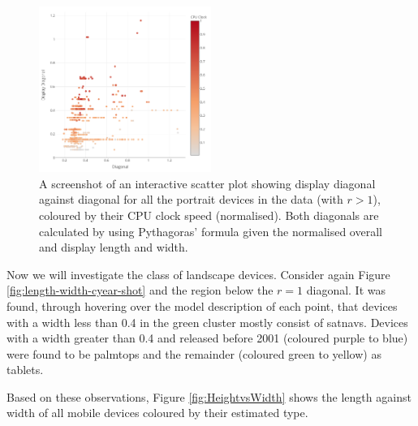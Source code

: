 \documentclass[conference]{IEEEtran}
\begin{document}
\begin{figure}
    \centering
    \includegraphics[width=0.5\textwidth]{../Visualisations/A/ddiag-diag-ccpu-shot.png}
	\caption{\label{fig:ddiag-diag-ccpu-shot}A screenshot of an interactive
	scatter plot showing display diagonal against diagonal
	for all the portrait devices in the data (with $r>1$), coloured by their
	CPU clock speed (normalised). Both diagonals are calculated by using
	Pythagoras' formula given the normalised overall and display length and
	width.}
\end{figure}

Now we will investigate the class of landscape devices. Consider again Figure
\ref{fig:length-width-cyear-shot} and the region below the $r=1$ diagonal. It
was found, through hovering over the model description of each point, that
devices with a width less than 0.4 in the green cluster mostly consist of
satnavs. Devices with a width greater than 0.4 and released before 2001
(coloured purple to blue) were found to be palmtops and the remainder
(coloured green to yellow) as tablets.


Based on these observations, Figure \ref{fig:HeightvsWidth} shows the length
against width of all mobile devices coloured by their estimated type.
\end{document}
